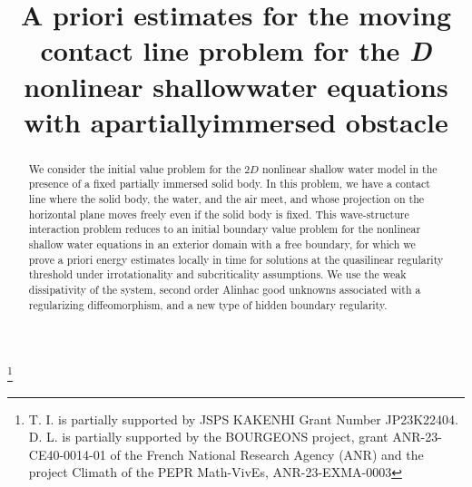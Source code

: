 \documentclass[JEP,XML,SOM,Unicode,NoFloatCountersInSection,published]{cedram}
\theoremstyle{definition}
\begin{document}
\frontmatter
\title[The contact line problem for the $2D$ NSW equations]
{A priori estimates for the moving contact line problem for the {\textit{D}} nonlinear shallow\nobreakspace water equations with a\nobreakspace partially\nobreakspace immersed obstacle}

\author[\initial{T.} \lastname{Iguchi}]{ }
\address{Department of Mathematics, Faculty of Science and Technology, Keio University,\\
3-14-1 Hiyoshi, Kohoku-ku, Yokohama 223-8522, Japan}

\author[\initial{D.} \lastname{Lannes}]{ }
\address{Institut de Mathématiques de Bordeaux, Université de Bordeaux et CNRS UMR 5251,\\
351 Cours de la Libération, 33405 Talence Cedex, France}

\thanks{T. I. is partially supported by JSPS KAKENHI Grant Number JP23K22404.
D. L. is partially supported by the BOURGEONS project, grant ANR-23-CE40-0014-01 of the French National Research Agency (ANR) and
the project Climath of the PEPR Math-VivEs, ANR-23-EXMA-0003}


\begin{abstract}
We consider the initial value problem for the $2D$ nonlinear shallow water model in the presence of a fixed partially immersed solid body. In this problem, we have a contact line where the solid body, the water, and the air meet, and whose projection on the horizontal plane moves freely even if the solid body is fixed. This wave-structure interaction problem reduces to an initial boundary value problem for the nonlinear shallow water equations in an exterior domain with a free boundary, for which we prove a priori energy estimates locally in time for solutions at the quasilinear regularity threshold under irrotationality and subcriticality assumptions. We use the weak dissipativity of the system, second order Alinhac good unknowns associated with a regularizing diﬀeomorphism, and a new type of hidden boundary regularity.
\end{abstract}

\end{document}
